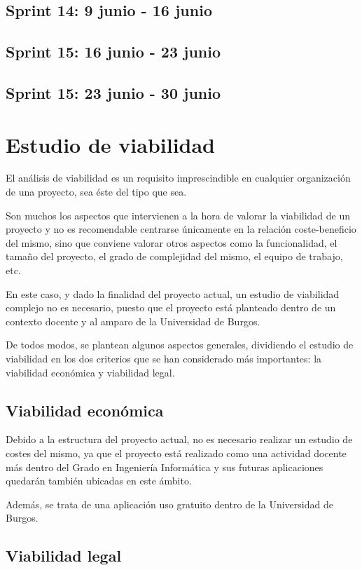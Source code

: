 \subsection{Sprint 14: 9 junio - 16 junio}
\subsection{Sprint 15: 16 junio - 23 junio}
\subsection{Sprint 15: 23 junio - 30 junio}

\section{Estudio de viabilidad}

El análisis de viabilidad es un requisito imprescindible en cualquier organización de una proyecto, sea éste del tipo que sea.

Son muchos los aspectos que intervienen a la hora de valorar la viabilidad de un proyecto y no es recomendable centrarse únicamente en la relación coste-beneficio del mismo, sino que conviene valorar otros aspectos como la funcionalidad, el tamaño del proyecto, el grado de complejidad del mismo, el equipo de trabajo, etc.

En este caso, y dado la finalidad del proyecto actual, un estudio de viabilidad complejo no es necesario, puesto que el proyecto está planteado dentro de un contexto docente y al amparo de la Universidad de Burgos. 

De todos modos, se plantean algunos aspectos generales, dividiendo el estudio de viabilidad en los dos criterios que se han considerado más importantes: la viabilidad económica y viabilidad legal.

\subsection{Viabilidad económica}

Debido a la estructura del proyecto actual, no es necesario realizar un estudio de costes del mismo, ya que el proyecto está realizado como una actividad docente más dentro del Grado en Ingeniería Informática y sus futuras aplicaciones quedarán también ubicadas en este ámbito.

Además, se trata de una aplicación uso gratuito dentro de la Universidad de Burgos.

\subsection{Viabilidad legal}

